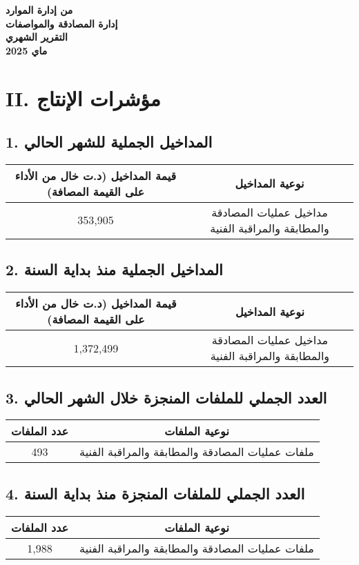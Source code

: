 \documentclass[a4paper,12pt]{article}
\begin{document}
\begin{center}
\textbf{من إدارة الموارد} \\
\textbf{إدارة المصادقة والمواصفات} \\
\textbf{التقرير الشهري} \\
\textbf{2025 ماي}
\end{center}

\section*{II. مؤشرات الإنتاج}

\subsection*{1. المداخيل الجملية للشهر الحالي}
\begin{tabular}{cc}
\toprule
\textbf{قيمة المداخيل (د.ت خال من الأداء على القيمة المصافة)} & \textbf{نوعية المداخيل} \\
\midrule
353,905 & مداخيل عمليات المصادقة والمطابقة والمراقبة الفنية \\

\bottomrule
\end{tabular}

\subsection*{2. المداخيل الجملية منذ بداية السنة}
\begin{tabular}{cc}
\toprule
\textbf{قيمة المداخيل (د.ت خال من الأداء على القيمة المصافة)} & \textbf{نوعية المداخيل} \\
\midrule
1,372,499 & مداخيل عمليات المصادقة والمطابقة والمراقبة الفنية \\

\bottomrule
\end{tabular}

\subsection*{3. العدد الجملي للملفات المنجزة خلال الشهر الحالي}
\begin{tabular}{cc}
\toprule
\textbf{عدد الملفات} & \textbf{نوعية الملفات} \\
\midrule
493 & ملفات عمليات المصادقة والمطابقة والمراقبة الفنية \\

\bottomrule
\end{tabular}

\subsection*{4. العدد الجملي للملفات المنجزة منذ بداية السنة}
\begin{tabular}{cc}
\toprule
\textbf{عدد الملفات} & \textbf{نوعية الملفات} \\
\midrule
1,988 & ملفات عمليات المصادقة والمطابقة والمراقبة الفنية \\

\bottomrule
\end{tabular}
\end{document}
